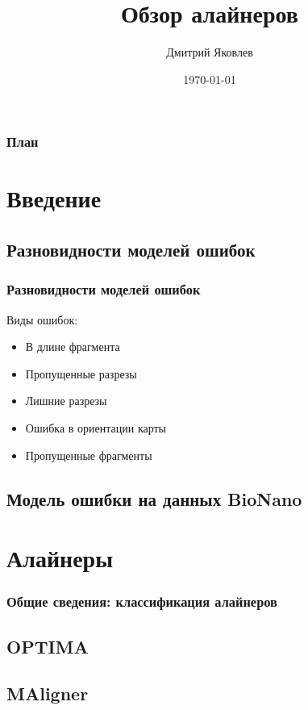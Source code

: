 \documentclass{beamer}
\title[Обзор алайнеров]{Обзор алайнеров}
\author{Дмитрий Яковлев}
\institute{EPAM Systems}
\date{\today}
\begin{document}
\graphicspath{{./img/}}

\begin{frame}
  \titlepage
\end{frame}

\begin{frame}
\frametitle{План}
\tableofcontents
\end{frame}

\section{Введение}


\subsection{Разновидности моделей ошибок}

\begin{frame}
\frametitle{Разновидности моделей ошибок}
Виды ошибок:
\begin{itemize}
  \item В длине фрагмента
  \item Пропущенные разрезы
  \item Лишние разрезы
  \item Ошибка в ориентации карты
  \item Пропущенные фрагменты
\end{itemize}

\end{frame}

\subsection{Модель ошибки на данных BioNano}


\section{Алайнеры}

\begin{frame}
\frametitle{Общие сведения: классификация алайнеров}

\end{frame}

\subsection{OPTIMA}


\subsection{MAligner}

\end{document}
